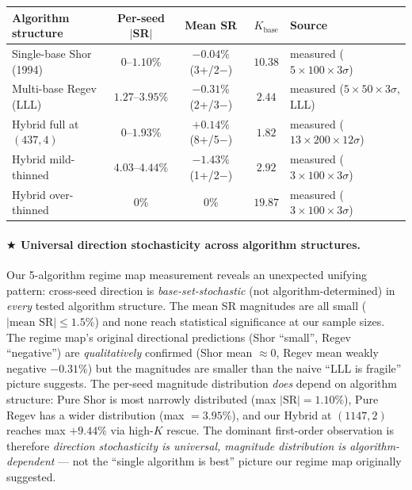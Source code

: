 \documentclass[11pt]{article}
\begin{document}
\begin{center}
\begin{tabular}{lcccl}
\toprule
Algorithm structure & Per-seed $|$SR$|$ & Mean SR & $K_{\text{base}}$ & Source \\
\midrule
Single-base Shor (1994) & $0$--$1.10\%$ & $-0.04\%$ (3+/2$-$) & $10.38$ & measured ($5{\times}100{\times}3\sigma$) \\
Multi-base Regev (LLL) & $1.27$--$3.95\%$ & $-0.31\%$ (2+/3$-$) & $2.44$ & measured ($5{\times}50{\times}3\sigma$, LLL) \\
Hybrid full at $(437, 4)$ & $0$--$1.93\%$ & $+0.14\%$ (8+/5$-$) & $1.82$ & measured ($13{\times}200{\times}12\sigma$) \\
Hybrid mild-thinned & $4.03$--$4.44\%$ & $-1.43\%$ (1+/2$-$) & $2.92$ & measured ($3{\times}100{\times}3\sigma$) \\
Hybrid over-thinned & $0\%$ & $0\%$ & $19.87$ & measured ($3{\times}100{\times}3\sigma$) \\
\bottomrule
\end{tabular}
\end{center}

\paragraph{$\bigstar$ Universal direction stochasticity across algorithm structures.}
Our 5-algorithm regime map measurement reveals an unexpected unifying pattern: cross-seed direction is \emph{base-set-stochastic} (not algorithm-determined) in \emph{every} tested algorithm structure. The mean SR magnitudes are all small ($|\text{mean SR}| \leq 1.5\%$) and none reach statistical significance at our sample sizes. The regime map's original directional predictions (Shor ``small'', Regev ``negative'') are \emph{qualitatively} confirmed (Shor mean $\approx 0$, Regev mean weakly negative $-0.31\%$) but the magnitudes are smaller than the naive ``LLL is fragile'' picture suggests. The per-seed magnitude distribution \emph{does} depend on algorithm structure: Pure Shor is most narrowly distributed (max $|\text{SR}| = 1.10\%$), Pure Regev has a wider distribution (max $= 3.95\%$), and our Hybrid at $(1147, 2)$ reaches max $+9.44\%$ via high-$K$ rescue. The dominant first-order observation is therefore \emph{direction stochasticity is universal, magnitude distribution is algorithm-dependent} --- not the ``single algorithm is best'' picture our regime map originally suggested.
\end{document}
